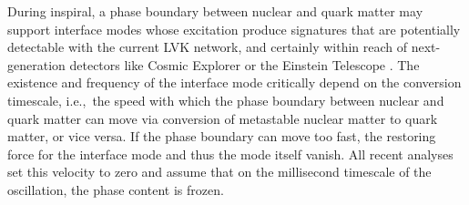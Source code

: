 \documentclass[10pt,superscriptaddress,
amsmath,aps,prc,twocolumn,nofootinbib,floatfix]{revtex4-1}
\newcommand{\mgacom}[1]{\textsf{\color[rgb]{0.8,0,0}[\textsuperscript{MGA} #1]}}
\begin{document}
During inspiral, a phase boundary between nuclear and quark matter may support interface modes whose excitation produce signatures that are potentially detectable with the current LVK network, and certainly within reach of next-generation detectors like Cosmic Explorer or the Einstein Telescope \cite{Counsell:2025hcv,Pereira:2025xsi}.
The existence and frequency of the interface mode critically depend on the conversion timescale, i.e.,~the speed with which the phase boundary between nuclear and quark matter can move via conversion of metastable nuclear matter to quark matter, or vice versa. If the phase boundary can move too fast, the restoring force for the interface mode and thus the mode itself vanish. All recent analyses %
\cite{Tonetto:2020bie,Counsell:2025hcv,Pereira:2025xsi}  set this velocity to zero and assume that on the millisecond timescale of the oscillation, the phase content is frozen.
\end{document}

